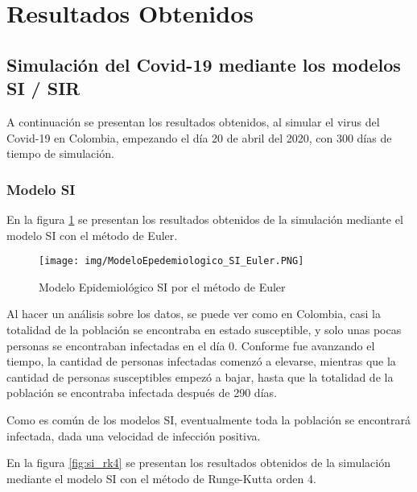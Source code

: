 \documentclass[a4paper,12pt]{article}
\begin{document}

\section{Resultados Obtenidos}

\subsection{Simulación del Covid-19 mediante los modelos SI / SIR}

A continuación se presentan los resultados obtenidos, al simular el virus del Covid-19 en Colombia, empezando el día 20 de abril del 2020, con 300 días de tiempo de simulación.

\subsubsection{Modelo SI}

En la figura \ref{fig:si_euler} se presentan los resultados obtenidos de la simulación mediante el modelo SI con el método de Euler.

\begin{figure}[ht!]
\centering
\texttt{[image: img/ModeloEpedemiologico\_SI\_Euler.PNG]}
\vspace{-1em}
\caption{Modelo Epidemiológico SI por el método de Euler}
\label{fig:si_euler}
\end{figure}  \par

\newpage

Al hacer un análisis sobre los datos, se puede ver como en Colombia, casi la totalidad de la población se encontraba en estado susceptible, y solo unas pocas personas se encontraban infectadas en el día 0. Conforme fue avanzando el tiempo, la cantidad de personas infectadas comenzó a elevarse, mientras que la cantidad de personas susceptibles empezó a bajar, hasta que la totalidad de la población se encontraba infectada después de 290 días. \par

Como es común de los modelos SI, eventualmente toda la población se encontrará infectada, dada una velocidad de infección positiva. \par

En la figura \ref{fig:si_rk4} se presentan los resultados obtenidos de la simulación mediante el modelo SI con el método de Runge-Kutta orden 4.
\end{document}
